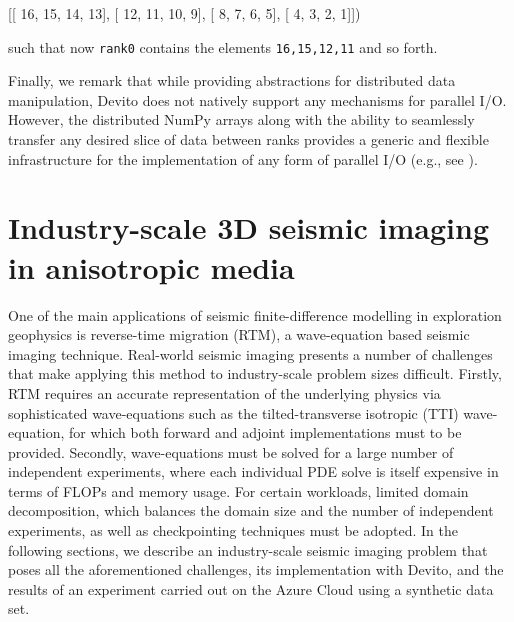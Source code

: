 \documentclass[10pt, conference]{IEEEtran}
\newenvironment{Shaded}{}{}
\newcommand{\DecValTok}[1]{\textcolor[rgb]{0.25,0.63,0.44}{{#1}}}
\newcommand{\NormalTok}[1]{{#1}}
\begin{document}
\begin{Shaded}
\begin{Highlighting}[]
    \NormalTok{[[ }\DecValTok{16}\NormalTok{, }\DecValTok{15}\NormalTok{, }\DecValTok{14}\NormalTok{, }\DecValTok{13}\NormalTok{],}
     \NormalTok{[ }\DecValTok{12}\NormalTok{, }\DecValTok{11}\NormalTok{, }\DecValTok{10}\NormalTok{,  }\DecValTok{9}\NormalTok{],}
     \NormalTok{[  }\DecValTok{8}\NormalTok{,  }\DecValTok{7}\NormalTok{,  }\DecValTok{6}\NormalTok{,  }\DecValTok{5}\NormalTok{],}
     \NormalTok{[  }\DecValTok{4}\NormalTok{,  }\DecValTok{3}\NormalTok{,  }\DecValTok{2}\NormalTok{,  }\DecValTok{1}\NormalTok{]])}
\end{Highlighting}
\end{Shaded}
\noindent
such that now \texttt{rank\phantom{\ }0} contains the elements
\texttt{16,\phantom{\ }15,\phantom{\ }12,\phantom{\ }11} and so forth.

Finally, we remark that while providing abstractions for distributed
data manipulation, Devito
does not natively support any mechanisms for parallel I/O. However, the
distributed NumPy arrays along with the ability to seamlessly transfer any
desired slice of data between ranks provides a generic and flexible
infrastructure for the implementation of any form of parallel I/O
(e.g., see \cite{witte2018alf}).

\section{Industry-scale 3D seismic imaging in anisotropic
media}\label{industry-scale-3d-seismic-imaging-in-anisotropic-media}

One of the main applications of seismic finite-difference modelling in
exploration geophysics is reverse-time migration (RTM), a wave-equation based
seismic imaging technique. Real-world seismic imaging presents a number of
challenges that make applying this method to industry-scale problem sizes
difficult. Firstly, RTM requires an accurate representation of the underlying
physics via sophisticated wave-equations such as the tilted-transverse isotropic
(TTI) wave-equation, for which both forward and adjoint implementations must to
be provided. Secondly, wave-equations must be solved for a large number of
independent experiments, where each individual PDE solve is itself expensive in
terms of FLOPs and memory usage. For certain workloads, limited domain
decomposition, which balances the domain size and the number of independent
experiments, as well as checkpointing techniques must be adopted. In the following
sections, we describe an industry-scale seismic imaging problem that poses all
the aforementioned challenges, its implementation with Devito, and the results
of an experiment carried out on the Azure Cloud using a synthetic data set.
\end{document}
